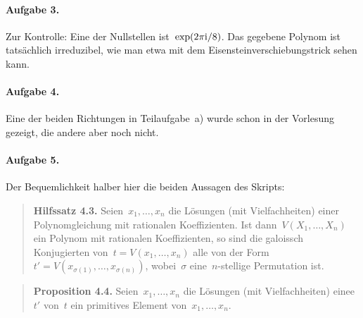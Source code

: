 \documentclass{../algblatt}
\begin{document}
\paragraph{Aufgabe 3.} Zur Kontrolle: Eine der Nullstellen
ist~$\exp(2\pi\mathrm{i}/8)$. Das gegebene Polynom ist tatsächlich irreduzibel, wie man
etwa mit dem Eisensteinverschiebungstrick sehen kann.

\paragraph{Aufgabe 4.} Eine der beiden Richtungen in Teilaufgabe~a) wurde schon
in der Vorlesung gezeigt, die andere aber noch nicht.

\paragraph{Aufgabe 5.} Der Bequemlichkeit halber hier die beiden Aussagen des
Skripts:
\begin{quote}
\textbf{Hilfssatz 4.3.}
Seien~$x_1,\ldots,x_n$ die Lösungen (mit Vielfachheiten) einer Polynomgleichung
mit rationalen Koeffizienten. Ist dann~$V(X_1,\ldots,X_n)$ ein Polynom mit
rationalen Koeffizienten, so sind die galoissch Konjugierten von~$t =
V(x_1,\ldots,x_n)$ alle von der Form~$t' =
V(x_{\sigma(1)},\ldots,x_{\sigma(n)})$, wobei~$\sigma$ eine~$n$-stellige
Permutation ist.
\end{quote}

\begin{quote}
\textbf{Proposition 4.4.}
Seien~$x_1,\ldots,x_n$ die Lösungen (mit Vielfachheiten) einee~$t'$ von~$t$ ein
primitives Element von~$x_1,\ldots,x_n$.
\end{quote}
\end{document}
